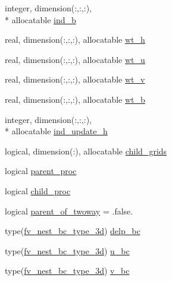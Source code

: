 \begin{DoxyCompactItemize}
integer, dimension(\-:,\-:,\-:), \\*
allocatable \hyperlink{structfv__arrays__mod_1_1fv__nest__type_ac3a7fc6c7539c84371aabdf03358423d}{ind\-\_\-b}
\item 
real, dimension(\-:,\-:,\-:), allocatable \hyperlink{structfv__arrays__mod_1_1fv__nest__type_af5fdff5fb218822f5644bc4f4f259ea8}{wt\-\_\-h}
\item 
real, dimension(\-:,\-:,\-:), allocatable \hyperlink{structfv__arrays__mod_1_1fv__nest__type_adeb1401d97eaf79d1c981c5d7bd9c9aa}{wt\-\_\-u}
\item 
real, dimension(\-:,\-:,\-:), allocatable \hyperlink{structfv__arrays__mod_1_1fv__nest__type_a987a44e252646188a908d61432fba24a}{wt\-\_\-v}
\item 
real, dimension(\-:,\-:,\-:), allocatable \hyperlink{structfv__arrays__mod_1_1fv__nest__type_aba478e4a4f147f23e80db3856a243724}{wt\-\_\-b}
\item 
integer, dimension(\-:,\-:,\-:), \\*
allocatable \hyperlink{structfv__arrays__mod_1_1fv__nest__type_a43b4cb8cbb446e895531952e42c0a4c1}{ind\-\_\-update\-\_\-h}
\item 
logical, dimension(\-:), allocatable \hyperlink{structfv__arrays__mod_1_1fv__nest__type_a81f66a31dbcd4e6d25c2c40fe713d270}{child\-\_\-grids}
\item 
logical \hyperlink{structfv__arrays__mod_1_1fv__nest__type_aee5b7faaaea5ce7126d4a750aac0dd65}{parent\-\_\-proc}
\item 
logical \hyperlink{structfv__arrays__mod_1_1fv__nest__type_a481dec3fef81744ffccc8d7c484d0996}{child\-\_\-proc}
\item 
logical \hyperlink{structfv__arrays__mod_1_1fv__nest__type_ad429837e6b04316f1a24ee0cdca2ea6a}{parent\-\_\-of\-\_\-twoway} = .false.
\item 
type(\hyperlink{structfv__arrays__mod_1_1fv__nest__bc__type__3d}{fv\-\_\-nest\-\_\-bc\-\_\-type\-\_\-3d}) \hyperlink{structfv__arrays__mod_1_1fv__nest__type_af01ad5bf7e21276cbdd2a462908ba9b7}{delp\-\_\-bc}
\item 
type(\hyperlink{structfv__arrays__mod_1_1fv__nest__bc__type__3d}{fv\-\_\-nest\-\_\-bc\-\_\-type\-\_\-3d}) \hyperlink{structfv__arrays__mod_1_1fv__nest__type_a6ab27401f6878ac25e0ae135a0421591}{u\-\_\-bc}
\item 
type(\hyperlink{structfv__arrays__mod_1_1fv__nest__bc__type__3d}{fv\-\_\-nest\-\_\-bc\-\_\-type\-\_\-3d}) \hyperlink{structfv__arrays__mod_1_1fv__nest__type_a63ef4f30326ec55106bc96e30a8e36ef}{v\-\_\-bc}

\end{DoxyCompactItemize}
